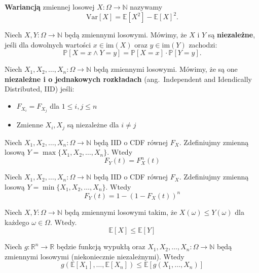 \begin{definition}
\textbf{Wariancją} zmiennej losowej $X:\Omega\to\mathbb{N}$ nazywamy
\[
    \mathrm{Var}[X] = \mathbb{E}[X^2]-\mathbb{E}[X]^2.
\]
\end{definition}

\begin{definition}
Niech $X,Y:\Omega\to\mathbb{N}$ będą zmiennymi losowymi.  
Mówimy, że $X$ i $Y$ są \textbf{niezależne}, jeśli dla dowolnych wartości $x \in \mathrm{im}(X)$ oraz $y \in \mathrm{im}(Y)$ zachodzi:
\[
\mathbb{P}[X = x \land Y = y] = \mathbb{P}[X = x] \cdot \mathbb{P}[Y = y].
\]
\end{definition}

\begin{definition}
Niech $X_1,X_2,\dots, X_n:\Omega\to\mathbb{N}$ będą zmiennymi losowymi. Mówimy, że są one \textbf{niezależne i o jednakowych rozkładach} (ang.~Independent and Idendically Distributed, IID) jeśli: 
\begin{itemize}
    \item $F_{X_i} = F_{X_j}$ dla $1\le i,j \le n$
    \item Zmienne $X_i,X_j$ są niezależne dla $i\ne j$
\end{itemize}  
\end{definition}

\begin{fact}\label{F:max_CDF}
Niech $X_1,X_2,\dots, X_n:\Omega\to\mathbb{N}$ będą IID o CDF równej $F_X$. Zdefiniujmy zmienną losową $Y = \max\{X_1,X_2,\dots, X_n\}$. Wtedy 
\[
    F_Y(t)=F_X^n(t)
\]
\end{fact}

\begin{fact}\label{F:min_CDF}
Niech $X_1,X_2,\dots, X_n:\Omega\to\mathbb{N}$ będą IID o CDF równej $F_X$. Zdefiniujmy zmienną losową $Y = \min\{X_1,X_2,\dots, X_n\}$. Wtedy 
\[
    F_Y(t)=1-(1-F_X(t))^n
\]
\end{fact}

\begin{fact}\label{F:montonicity_of_expectation}
Niech $X,Y:\Omega\to\mathbb{N}$ będą zmiennymi losowymi takim, że $X(\omega)\le Y(\omega)$ dla każdego $\omega\in\Omega$. Wtedy. 
\[
    \mathbb{E}[X] \le \mathbb{E}[Y]
\]
\end{fact}


\begin{theorem}\label{T:Jensen} 
Niech $g:\mathbb{R}^n\to\mathbb{R}$ będzie funkcją wypukłą oraz $X_1,X_2,\dots, X_n:\Omega\to\mathbb{N}$ będą zmiennymi losowymi (niekoniecznie niezależnymi). Wtedy
\[
    g(\mathbb{E}[X_1],\dots, \mathbb{E}[X_n]) \le \mathbb{E}[g(X_1,\dots,X_n)]
\]
\end{theorem}


